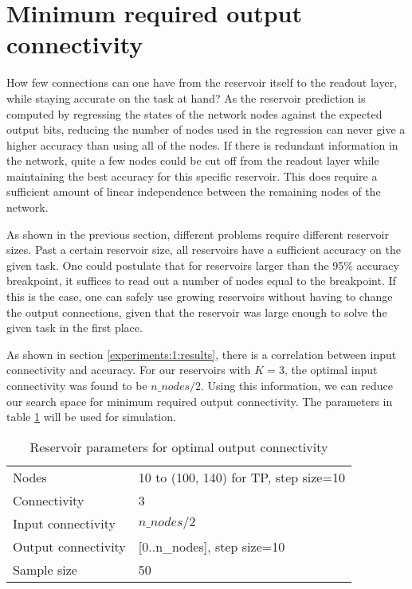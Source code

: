 \section{Minimum required output connectivity}

How few connections can one have from the reservoir itself to the readout layer,
while staying accurate on the task at hand?
As the reservoir prediction is computed by regressing the states of the network nodes against the expected output bits,
reducing the number of nodes used in the regression can never give a higher accuracy than using all of the nodes.
If there is redundant information in the network, quite a few nodes could be cut off from the readout layer while maintaining the best accuracy for this specific reservoir.
This does require a sufficient amount of linear independence between the remaining nodes of the network.

As shown in the previous section, different problems require different reservoir sizes.
Past a certain reservoir size, all reservoirs have a sufficient accuracy on the given task.
One could postulate that for reservoirs larger than the 95\% accuracy breakpoint,
it suffices to read out a number of nodes equal to the breakpoint.
If this is the case, one can safely use growing reservoirs without having to change the output connections,
given that the reservoir was large enough to solve the given task in the first place.

As shown in section \ref{experiments:1:results}, there is a correlation between input connectivity and accuracy.
For our reservoirs with $K=3$, the optimal input connectivity was found to be $n\_nodes/2$.
Using this information, we can reduce our search space for minimum required output connectivity.
The parameters in table \ref{tab:oc-reservoir-parameters} will be used for simulation.

\begin{table}[ht]
    \centering
    \caption{Reservoir parameters for optimal output connectivity}
    \label{tab:oc-reservoir-parameters}
    \begin{tabular}{ll}
        Nodes               & 10 to (100, 140) for TP, step size=10 \\
        Connectivity        & 3                              \\
        Input connectivity  & $ n\_nodes / 2 $               \\
        Output connectivity & [0..n\_nodes], step size=10    \\
        Sample size         & 50
    \end{tabular}
\end{table}

